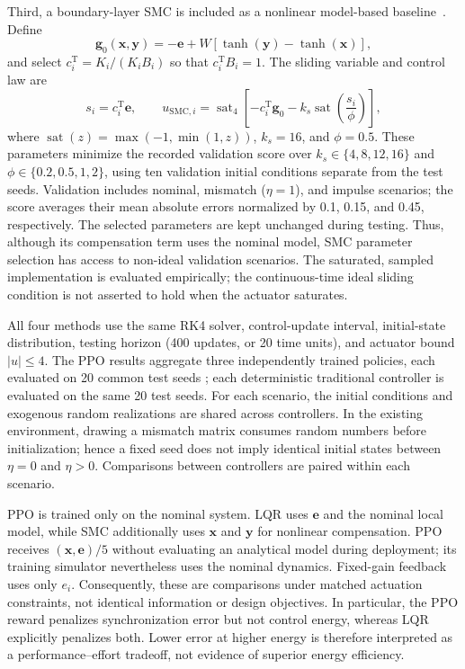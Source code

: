 \documentclass[a4paper,fleqn]{cas-dc}
\theoremstyle{plain}
\theoremstyle{definition}
\begin{document}
Third, a boundary-layer SMC is included as a nonlinear model-based baseline~\cite{feki2009sliding,su2021fixed}. Define
\begin{equation}
	\mathbf g_0(\mathbf x,\mathbf y)=-\mathbf e+W\left[\tanh(\mathbf y)-\tanh(\mathbf x)\right],
	\label{eq:nominal_error_drift}
\end{equation}
and select $c_i^{\mathrm T}=K_i/(K_iB_i)$ so that $c_i^{\mathrm T}B_i=1$. The sliding variable and control law are
\begin{equation}
	s_i=c_i^{\mathrm T}\mathbf e,\qquad
	u_{\mathrm{SMC},i}=\operatorname{sat}_{4}\!\left[-c_i^{\mathrm T}\mathbf g_0-k_s\operatorname{sat}\!\left(\frac{s_i}{\phi}\right)\right],
	\label{eq:smc_baseline}
\end{equation}
where $\operatorname{sat}(z)=\max(-1,\min(1,z))$, $k_s=16$, and $\phi=0.5$. These parameters minimize the recorded validation score over $k_s\in\{4,8,12,16\}$ and $\phi\in\{0.2,0.5,1,2\}$, using ten validation initial conditions separate from the test seeds. Validation includes nominal, mismatch ($\eta=1$), and impulse scenarios; the score averages their mean absolute errors normalized by 0.1, 0.15, and 0.45, respectively. The selected parameters are kept unchanged during testing. Thus, although its compensation term uses the nominal model, SMC parameter selection has access to non-ideal validation scenarios. The saturated, sampled implementation is evaluated empirically; the continuous-time ideal sliding condition is not asserted to hold when the actuator saturates.

All four methods use the same RK4 solver, control-update interval, initial-state distribution, testing horizon (400 updates, or 20 time units), and actuator bound $|u|\leq4$. The PPO results aggregate three independently trained policies, each evaluated on 20 common test seeds ; each deterministic traditional controller is evaluated on the same 20 test seeds. For each scenario, the initial conditions and exogenous random realizations are shared across controllers. In the existing environment, drawing a mismatch matrix consumes random numbers before initialization; hence a fixed seed does not imply identical initial states between $\eta=0$ and $\eta>0$. Comparisons between controllers are paired within each scenario.

PPO is trained only on the nominal system. LQR uses $\mathbf e$ and the nominal local model, while SMC additionally uses $\mathbf x$ and $\mathbf y$ for nonlinear compensation. PPO receives $(\mathbf x,\mathbf e)/5$ without evaluating an analytical model during deployment; its training simulator nevertheless uses the nominal dynamics. Fixed-gain feedback uses only $e_i$. Consequently, these are comparisons under matched actuation constraints, not identical information or design objectives. In particular, the PPO reward penalizes synchronization error but not control energy, whereas LQR explicitly penalizes both. Lower error at higher energy is therefore interpreted as a performance--effort tradeoff, not evidence of superior energy efficiency.
\end{document}
